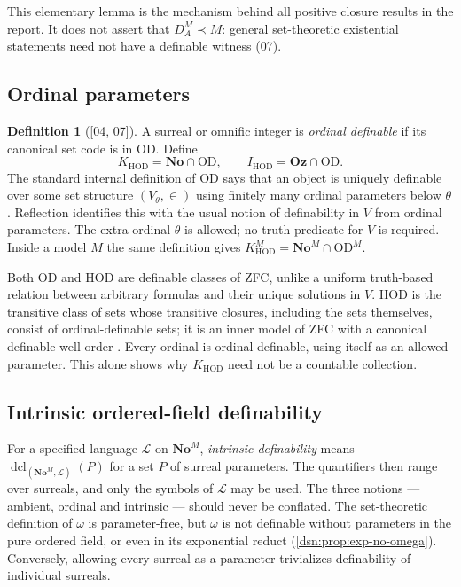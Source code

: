 \documentclass[11pt,a4paper]{article}
\numberwithin{equation}{section}
\theoremstyle{definition}
\newtheorem{definition}[definition]{Definition}
\theoremstyle{remark}
\newcommand{\No}{\mathbf{No}}
\newcommand{\Oz}{\mathbf{Oz}}
\newcommand{\OD}{\mathrm{OD}}
\newcommand{\HOD}{\mathrm{HOD}}
\newcommand{\dcl}{\operatorname{dcl}}
\newcommand{\KH}{K_{\HOD}}
\newcommand{\IH}{I_{\HOD}}
\newcommand{\src}[1]{\textup{\textsf{\small[#1]}}}
\begin{document}
This elementary lemma is the mechanism behind all positive closure results
in the report. It does not assert that $D^M_A\prec M$: general
set-theoretic existential statements need not have a definable witness
(07).

\subsection{Ordinal parameters}

\begin{definition}[\src{04, 07}]\label{dsn:def:OD}
A surreal or omnific integer is \emph{ordinal definable} if its canonical
set code is in $\OD$. Define
\[
 \KH=\No\cap\OD,\qquad \IH=\Oz\cap\OD.
\]
The standard internal definition of $\OD$ says that an object is uniquely
definable over some set structure $(V_\theta,\in)$ using finitely many
ordinal parameters below $\theta$. Reflection identifies this with the
usual notion of definability in $V$ from ordinal parameters. The extra
ordinal $\theta$ is allowed; no truth predicate for $V$ is required.
Inside a model $M$ the same definition gives $\KH^M=\No^M\cap\OD^M$.
\end{definition}

Both $\OD$ and $\HOD$ are definable classes of ZFC, unlike a uniform
truth-based relation between arbitrary formulas and their unique
solutions in $V$. $\HOD$ is the transitive class of sets whose transitive
closures, including the sets themselves, consist of ordinal-definable
sets; it is an inner model of ZFC with a canonical definable well-order
\cite{Jech,GoldbergPoveda}. Every ordinal is ordinal definable, using
itself as an allowed parameter. This alone shows why $\KH$ need not
be a countable collection.

\subsection{Intrinsic ordered-field definability}

For a specified language $\mathcal L$ on $\No^M$, \emph{intrinsic
definability} means $\dcl_{(\No^M,\mathcal L)}(P)$ for a set $P$ of surreal
parameters. The quantifiers then range over surreals, and only the symbols
of $\mathcal L$ may be used. The three notions --- ambient, ordinal and
intrinsic --- should never be conflated. The set-theoretic definition of
$\omega$ is parameter-free, but $\omega$ is not definable without
parameters in the pure ordered field, or even in its exponential reduct
(\cref{dsn:prop:exp-no-omega}). Conversely, allowing every surreal as a
parameter trivializes definability of individual surreals.
\end{document}
